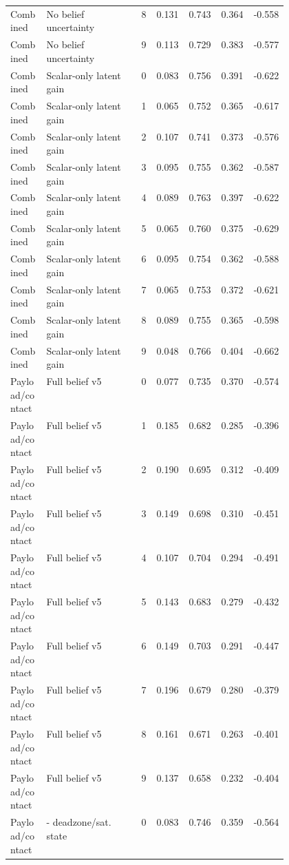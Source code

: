 \documentclass{article}
\begin{document}
\begin{center}
\begin{longtable}{p{0.13\linewidth}p{0.34\linewidth}rrrrr}
Combined & No belief uncertainty & 8 & 0.131 & 0.743 & 0.364 & -0.558\\
Combined & No belief uncertainty & 9 & 0.113 & 0.729 & 0.383 & -0.577\\
Combined & Scalar-only latent gain & 0 & 0.083 & 0.756 & 0.391 & -0.622\\
Combined & Scalar-only latent gain & 1 & 0.065 & 0.752 & 0.365 & -0.617\\
Combined & Scalar-only latent gain & 2 & 0.107 & 0.741 & 0.373 & -0.576\\
Combined & Scalar-only latent gain & 3 & 0.095 & 0.755 & 0.362 & -0.587\\
Combined & Scalar-only latent gain & 4 & 0.089 & 0.763 & 0.397 & -0.622\\
Combined & Scalar-only latent gain & 5 & 0.065 & 0.760 & 0.375 & -0.629\\
Combined & Scalar-only latent gain & 6 & 0.095 & 0.754 & 0.362 & -0.588\\
Combined & Scalar-only latent gain & 7 & 0.065 & 0.753 & 0.372 & -0.621\\
Combined & Scalar-only latent gain & 8 & 0.089 & 0.755 & 0.365 & -0.598\\
Combined & Scalar-only latent gain & 9 & 0.048 & 0.766 & 0.404 & -0.662\\
Payload/contact & Full belief v5 & 0 & 0.077 & 0.735 & 0.370 & -0.574\\
Payload/contact & Full belief v5 & 1 & 0.185 & 0.682 & 0.285 & -0.396\\
Payload/contact & Full belief v5 & 2 & 0.190 & 0.695 & 0.312 & -0.409\\
Payload/contact & Full belief v5 & 3 & 0.149 & 0.698 & 0.310 & -0.451\\
Payload/contact & Full belief v5 & 4 & 0.107 & 0.704 & 0.294 & -0.491\\
Payload/contact & Full belief v5 & 5 & 0.143 & 0.683 & 0.279 & -0.432\\
Payload/contact & Full belief v5 & 6 & 0.149 & 0.703 & 0.291 & -0.447\\
Payload/contact & Full belief v5 & 7 & 0.196 & 0.679 & 0.280 & -0.379\\
Payload/contact & Full belief v5 & 8 & 0.161 & 0.671 & 0.263 & -0.401\\
Payload/contact & Full belief v5 & 9 & 0.137 & 0.658 & 0.232 & -0.404\\
Payload/contact & - deadzone/sat. state & 0 & 0.083 & 0.746 & 0.359 & -0.564\\

\end{longtable}
\end{center}
\end{document}

